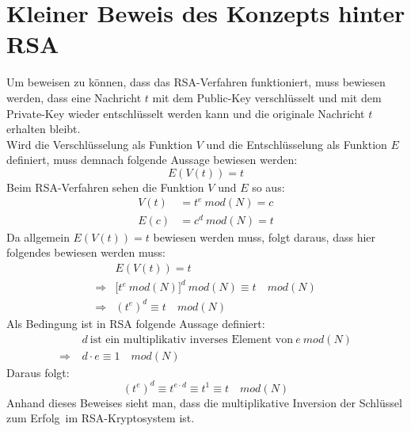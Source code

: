 \section{Kleiner Beweis des Konzepts hinter RSA}
\label{sec:Beweis}
Um beweisen zu können, dass das RSA-Verfahren funktioniert, muss bewiesen werden, dass eine Nachricht $t$ mit dem Public-Key verschlüsselt und mit dem Private-Key wieder entschlüsselt werden kann und die originale Nachricht $t$ erhalten bleibt.\\
Wird die Verschlüsselung als Funktion $V$ und die Entschlüsselung als Funktion $E$ definiert, muss demnach folgende Aussage bewiesen werden:\\
\begin{equation*}
E(V(t))=t
\end{equation*}
Beim RSA-Verfahren sehen die Funktion $V$ und $E$ so aus:
\begin{align*}
V(t)&=t^{e}~mod(N)=c\\
E(c)&=c^{d}~mod(N)=t
\end{align*}
Da allgemein $E(V(t))=t$ bewiesen werden muss, folgt daraus, dass hier folgendes bewiesen werden muss:
\begin{align*}
& E(V(t))=t\\
\Rightarrow & \Big[t^{e}~mod(N)\Big]^{d}~mod(N) \equiv t \quad mod(N)\\
\Rightarrow & (t^{e})^{d} \equiv t \quad mod(N)
\end{align*}
Als Bedingung ist in RSA folgende Aussage definiert:
\begin{align*}
& d~\text{ist ein multiplikativ inverses Element von}~e~mod(N)\\
\Rightarrow~ & d\cdot e \equiv 1 \quad mod(N)
\end{align*}
Daraus folgt:
\begin{equation*}
(t^{e})^{d} \equiv t^{e\cdot d} \equiv t^{1} \equiv t \quad mod(N)
\end{equation*}
Anhand dieses Beweises sieht man, dass die multiplikative Inversion der \glqq Schlüssel zum Erfolg\grqq~im RSA-Kryptosystem ist.
